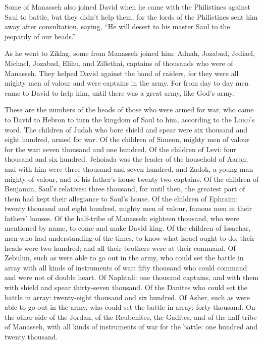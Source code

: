  Some of Manasseh also joined David when he came with the
Philistines against Saul to battle, but they didn't help them, for the
lords of the Philistines sent him away after consultation, saying, ``He
will desert to his master Saul to the jeopardy of our heads.''

 As he went to Ziklag, some from Manasseh joined him:
Adnah, Jozabad, Jediael, Michael, Jozabad, Elihu, and Zillethai,
captains of thousands who were of Manasseh.  They helped
David against the band of raiders, for they were all mighty men of
valour and were captains in the army.  For from day to
day men came to David to help him, until there was a great army, like
God's army.

 These are the numbers of the heads of those who were
armed for war, who came to David to Hebron to turn the kingdom of Saul
to him, according to the \textsc{Lord}'s word.  The
children of Judah who bore shield and spear were six thousand and eight
hundred, armed for war.  Of the children of Simeon,
mighty men of valour for the war: seven thousand and one hundred.
 Of the children of Levi: four thousand and six hundred.
 Jehoiada was the leader of the household of Aaron; and
with him were three thousand and seven hundred,  and
Zadok, a young man mighty of valour, and of his father's house
twenty-two captains.  Of the children of Benjamin, Saul's
relatives: three thousand, for until then, the greatest part of them had
kept their allegiance to Saul's house.  Of the children
of Ephraim: twenty thousand and eight hundred, mighty men of valour,
famous men in their fathers' houses.  Of the half-tribe
of Manasseh: eighteen thousand, who were mentioned by name, to come and
make David king.  Of the children of Issachar, men who
had understanding of the times, to know what Israel ought to do, their
heads were two hundred; and all their brothers were at their command.
 Of Zebulun, such as were able to go out in the army, who
could set the battle in array with all kinds of instruments of war:
fifty thousand who could command and were not of double heart.
 Of Naphtali: one thousand captains, and with them with
shield and spear thirty-seven thousand.  Of the Danites
who could set the battle in array: twenty-eight thousand and six
hundred.  Of Asher, such as were able to go out in the
army, who could set the battle in array: forty thousand. 
On the other side of the Jordan, of the Reubenites, the Gadites, and of
the half-tribe of Manasseh, with all kinds of instruments of war for the
battle: one hundred and twenty thousand.

